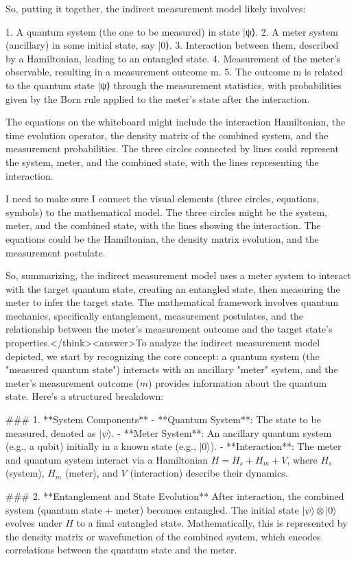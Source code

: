 So, putting it together, the indirect measurement model likely involves:

1. A quantum system (the one to be measured) in state |ψ⟩.
2. A meter system (ancillary) in some initial state, say |0⟩.
3. Interaction between them, described by a Hamiltonian, leading to an entangled state.
4. Measurement of the meter's observable, resulting in a measurement outcome m.
5. The outcome m is related to the quantum state |ψ⟩ through the measurement statistics, with probabilities given by the Born rule applied to the meter's state after the interaction.

The equations on the whiteboard might include the interaction Hamiltonian, the time evolution operator, the density matrix of the combined system, and the measurement probabilities. The three circles connected by lines could represent the system, meter, and the combined state, with the lines representing the interaction. 

I need to make sure I connect the visual elements (three circles, equations, symbols) to the mathematical model. The three circles might be the system, meter, and the combined state, with the lines showing the interaction. The equations could be the Hamiltonian, the density matrix evolution, and the measurement postulate. 

So, summarizing, the indirect measurement model uses a meter system to interact with the target quantum state, creating an entangled state, then measuring the meter to infer the target state. The mathematical framework involves quantum mechanics, specifically entanglement, measurement postulates, and the relationship between the meter's measurement outcome and the target state's properties.</think><answer>To analyze the indirect measurement model depicted, we start by recognizing the core concept: a quantum system (the "measured quantum state") interacts with an ancillary "meter" system, and the meter’s measurement outcome (\(m\)) provides information about the quantum state. Here’s a structured breakdown:  

### 1. **System Components**  
- **Quantum System**: The state to be measured, denoted as \(|\psi\rangle\).  
- **Meter System**: An ancillary quantum system (e.g., a qubit) initially in a known state (e.g., \(|0\rangle\)).  
- **Interaction**: The meter and quantum system interact via a Hamiltonian \(H = H_s + H_m + V\), where \(H_s\) (system), \(H_m\) (meter), and \(V\) (interaction) describe their dynamics.  

### 2. **Entanglement and State Evolution**  
After interaction, the combined system (quantum state + meter) becomes entangled. The initial state \(|\psi\rangle \otimes |0\rangle\) evolves under \(H\) to a final entangled state. Mathematically, this is represented by the density matrix or wavefunction of the combined system, which encodes correlations between the quantum state and the meter.  

